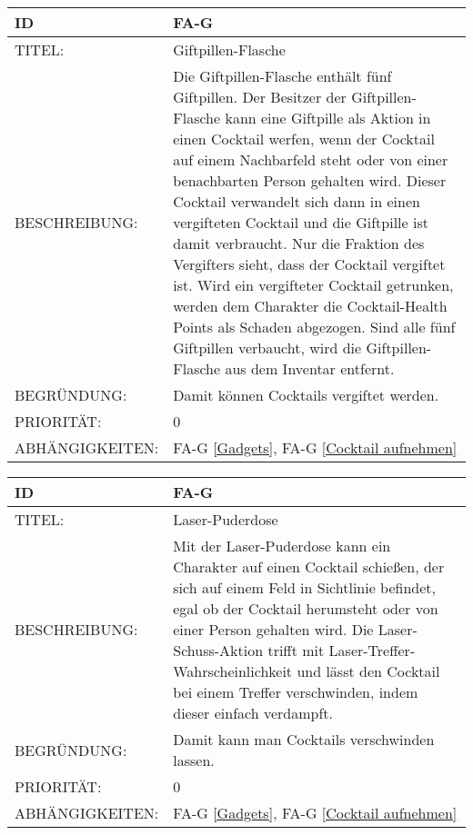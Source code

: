 \begin{tabularx}{16cm}{l|X}
	{table}\label{Giftpillen-Flasche}
	\textbf{ID} & \textbf{FA-G \arabic{table}} \\
	\hline
	TITEL: & Giftpillen-Flasche \\
	\hline
	BESCHREIBUNG: & Die Giftpillen-Flasche enthält fünf Giftpillen. Der Besitzer der Giftpillen-Flasche kann eine Giftpille als Aktion in einen Cocktail werfen, wenn der Cocktail auf einem Nachbarfeld steht oder von einer benachbarten Person gehalten wird. Dieser Cocktail verwandelt sich dann in einen vergifteten Cocktail und die Giftpille ist damit verbraucht. Nur die Fraktion des Vergifters sieht, dass der Cocktail vergiftet ist. Wird ein vergifteter Cocktail getrunken, werden dem Charakter die Cocktail-Health Points als Schaden abgezogen. Sind alle fünf Giftpillen verbaucht, wird die Giftpillen-Flasche aus dem Inventar entfernt.  \\
	\hline
	BEGRÜNDUNG: &  Damit können Cocktails vergiftet werden. \\
	\hline
	PRIORITÄT: & 0\\
	\hline
	ABHÄNGIGKEITEN: & FA-G \ref{Gadgets}, FA-G \ref{Cocktail aufnehmen} \\
\end{tabularx}

\begin{tabularx}{16cm}{l|X}
	{table}\label{Laser-Puderdose}
	\textbf{ID} & \textbf{FA-G \arabic{table}} \\
	\hline
	TITEL: & Laser-Puderdose \\
	\hline
	BESCHREIBUNG: & Mit der Laser-Puderdose kann ein Charakter auf einen Cocktail schießen, der sich auf einem Feld in Sichtlinie befindet, egal ob der Cocktail herumsteht oder von einer Person gehalten wird. Die Laser-Schuss-Aktion trifft mit Laser-Treffer-Wahrscheinlichkeit und lässt den Cocktail bei einem Treffer verschwinden, indem dieser einfach verdampft. \\
	\hline
	BEGRÜNDUNG: &  Damit kann man Cocktails verschwinden lassen. \\
	\hline
	PRIORITÄT: & 0\\
	\hline
	ABHÄNGIGKEITEN: & FA-G \ref{Gadgets}, FA-G \ref{Cocktail aufnehmen} \\
\end{tabularx}

